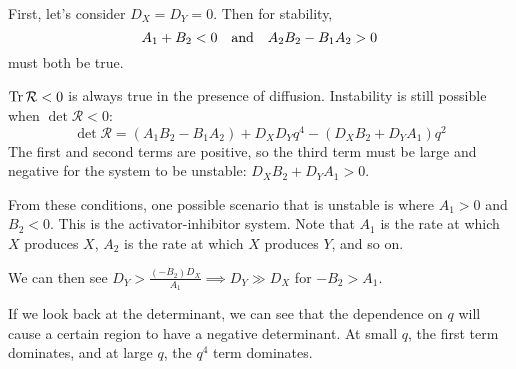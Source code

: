 \documentclass[a4paper,twoside,master.tex]{subfiles}
\begin{document}
First, let's consider $ D_X = D_Y = 0 $. Then for stability,
\begin{equation}
    A_1 + B_2 < 0 \qand A_2 B_2 - B_1 A_2 > 0
\end{equation}
must both be true.

$ \Tr \mathcal{R} < 0 $ is always true in the presence of diffusion. Instability is still possible when $ \det\mathcal{R} < 0 $:
\begin{equation}
    \det\mathcal{R} = (A_1 B_2 - B_1 A_2) + D_X D_Y q^4 - (D_X B_2 + D_Y A_1) q^2
\end{equation}
The first and second terms are positive, so the third term must be large and negative for the system to be unstable: $ D_X B_2 + D_Y A_1 > 0 $.

From these conditions, one possible scenario that is unstable is where $ A_1 > 0 $ and $ B_2 < 0 $. This is the activator-inhibitor system. Note that $ A_1 $ is the rate at which $ X $ produces $ X $, $ A_2 $ is the rate at which $ X $ produces $ Y $, and so on.

We can then see $ D_Y > \frac{(-B_2)D_X}{A_1} \implies D_Y \gg D_X $ for $ -B_2 > A_1 $.

If we look back at the determinant, we can see that the dependence on $ q $ will cause a certain region to have a negative determinant. At small $ q $, the first term dominates, and at large $ q $, the $ q^4 $ term dominates.
\end{document}
